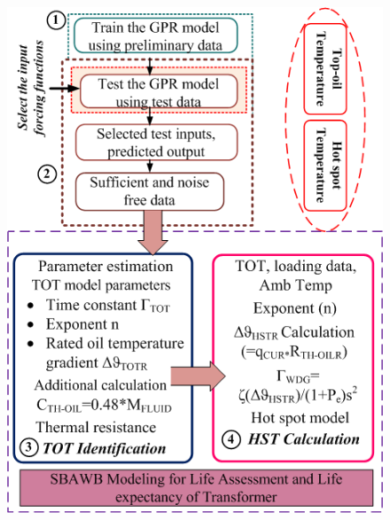 \documentclass[10pt,hyperref={pdfpagelabels=false}]{beamer}
\begin{document}
\begin{frame}[fragile]
\begin{columns}
\begin{figure}
    \centering
    \includegraphics[scale=0.3]{APS_fig11.png}
    \label{fig:Problem_5_1_1}
\end{figure}
\end{columns}
\end{frame}

\end{document}
